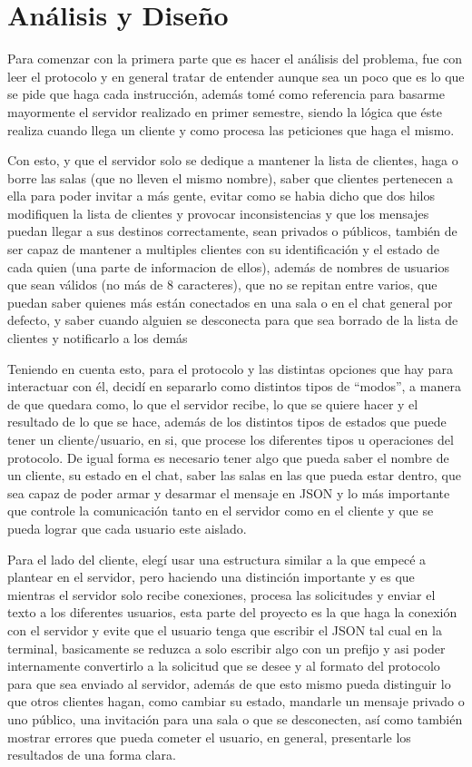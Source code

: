 \documentclass[12pt,letterpaper]{article}
\begin{document}
\newpage
\section{Análisis y Diseño}
Para comenzar con la primera parte que es hacer el análisis del problema, fue con leer el protocolo y en general tratar de entender aunque sea un poco que es lo que se pide que haga cada instrucción, además tomé como referencia para basarme mayormente el servidor realizado en primer semestre, siendo la lógica que éste realiza cuando llega un cliente y como procesa las peticiones que haga el mismo.

Con esto, y que el servidor solo se dedique a mantener la lista de clientes, haga o borre las salas (que no lleven el mismo nombre), saber que clientes pertenecen a ella para poder invitar a más gente, evitar como se habia dicho que dos hilos modifiquen la lista de clientes y provocar inconsistencias y que los mensajes puedan llegar a sus destinos correctamente, sean privados o públicos, también de ser capaz de mantener a multiples clientes con su identificación y el estado de cada quien (una parte de informacion de ellos), además de nombres de usuarios que sean válidos (no más de 8 caracteres), que no se repitan entre varios, que puedan saber quienes más están conectados en una sala o en el chat general por defecto, y saber cuando alguien se desconecta para que sea borrado de la lista de clientes y notificarlo a los demás

Teniendo en cuenta esto, para el protocolo y las distintas opciones que hay para interactuar con él, decidí en separarlo como distintos tipos de ``modos'', a manera de que quedara como, lo que el servidor recibe, lo que se quiere hacer y el resultado de lo que se hace, además de los distintos tipos de estados que puede tener un cliente/usuario, en si, que procese los diferentes tipos u operaciones del protocolo. De igual forma es necesario tener algo que pueda saber el nombre de un cliente, su estado en el chat, saber las salas en las que pueda estar dentro, que sea capaz de poder armar y desarmar el mensaje en JSON y lo más importante que controle la comunicación tanto en el servidor como en el cliente y que se pueda lograr que cada usuario este aislado.

Para el lado del cliente, elegí usar una estructura similar a la que empecé a plantear en el servidor, pero haciendo una distinción importante y es que mientras el servidor solo recibe conexiones, procesa las solicitudes y enviar el texto a los diferentes usuarios, esta parte del proyecto es la que haga la conexión con el servidor y evite que el usuario tenga que escribir el JSON tal cual en la terminal, basicamente se reduzca a solo escribir algo con un prefijo y asi poder internamente convertirlo a la solicitud que se desee y al formato del protocolo para que sea enviado al servidor, además de que esto mismo pueda distinguir lo que otros clientes hagan, como cambiar su estado, mandarle un mensaje privado o uno público, una invitación para una sala o que se desconecten, así como también mostrar errores que pueda cometer el usuario, en general, presentarle los resultados de una forma clara.
\end{document}
